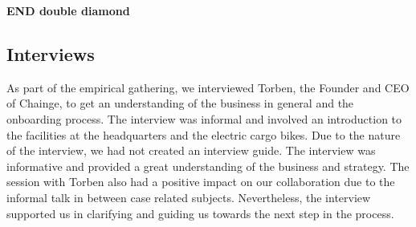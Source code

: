 \textbf{END double diamond}

\hypertarget{sec:interviews}{%
\subsection{Interviews}\label{sec:interviews}}

As part of the empirical gathering, we interviewed Torben, the Founder
and CEO of Chainge, to get an understanding of the business in general
and the onboarding process. The interview was informal and involved an
introduction to the facilities at the headquarters and the electric
cargo bikes. Due to the nature of the interview, we had not created an
interview guide. The interview was informative and provided a great
understanding of the business and strategy. The session with Torben also
had a positive impact on our collaboration due to the informal talk in
between case related subjects. Nevertheless, the interview supported us
in clarifying and guiding us towards the next step in the process.

